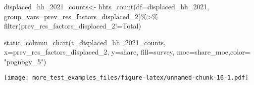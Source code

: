 \documentclass[
]{article}
\newenvironment{Shaded}{\begin{snugshade}}{\end{snugshade}}
\newcommand{\AttributeTok}[1]{\textcolor[rgb]{0.77,0.63,0.00}{#1}}
\newcommand{\FunctionTok}[1]{\textcolor[rgb]{0.00,0.00,0.00}{#1}}
\newcommand{\NormalTok}[1]{#1}
\newcommand{\OtherTok}[1]{\textcolor[rgb]{0.56,0.35,0.01}{#1}}
\newcommand{\SpecialCharTok}[1]{\textcolor[rgb]{0.00,0.00,0.00}{#1}}
\newcommand{\StringTok}[1]{\textcolor[rgb]{0.31,0.60,0.02}{#1}}
\begin{document}
\begin{Shaded}
\begin{Highlighting}[]
\NormalTok{displaced\_hh\_2021\_counts}\OtherTok{\textless{}{-}} \FunctionTok{hhts\_count}\NormalTok{(}\AttributeTok{df=}\NormalTok{displaced\_hh\_2021, }\AttributeTok{group\_vars=}\StringTok{\textquotesingle{}prev\_res\_factors\_displaced\_2\textquotesingle{}}\NormalTok{)}\SpecialCharTok{\%\textgreater{}\%}
\FunctionTok{filter}\NormalTok{(prev\_res\_factors\_displaced\_2}\SpecialCharTok{!=}\StringTok{\textquotesingle{}Total\textquotesingle{}}\NormalTok{)}

\FunctionTok{static\_column\_chart}\NormalTok{(}\AttributeTok{t=}\NormalTok{displaced\_hh\_2021\_counts, }\AttributeTok{x=}\StringTok{\textquotesingle{}prev\_res\_factors\_displaced\_2\textquotesingle{}}\NormalTok{, }\AttributeTok{y=}\StringTok{\textquotesingle{}share\textquotesingle{}}\NormalTok{, }\AttributeTok{fill=}\StringTok{\textquotesingle{}survey\textquotesingle{}}\NormalTok{, }\AttributeTok{moe=}\StringTok{\textquotesingle{}share\_moe\textquotesingle{}}\NormalTok{,}\AttributeTok{color=}  \StringTok{"pognbgy\_5"}\NormalTok{)}
\end{Highlighting}
\end{Shaded}

\texttt{[image: more\_test\_examples\_files/figure-latex/unnamed-chunk-16-1.pdf]}
\end{document}
